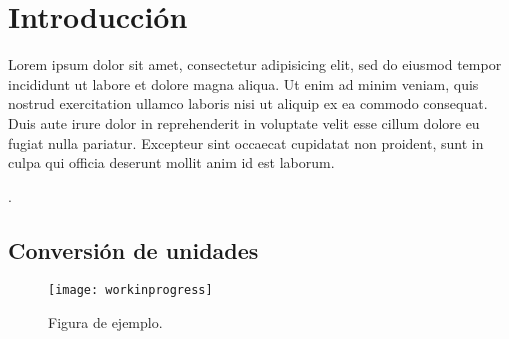 \chapter{Introducción}
Lorem ipsum dolor sit amet, consectetur adipisicing elit, sed do eiusmod tempor incididunt ut labore et dolore magna aliqua. Ut enim ad minim veniam, quis nostrud exercitation ullamco laboris nisi ut aliquip ex ea commodo consequat. Duis aute irure dolor in reprehenderit in voluptate velit esse cillum dolore eu fugiat nulla pariatur. Excepteur sint occaecat cupidatat non proident, sunt in culpa qui officia deserunt mollit anim id est laborum\citep{ejemplo01}.



\lipsum[2]\cite{ejemplo02}.

\lipsum[3-6]\citep{Dan,Baz}

\section{Conversión de unidades}%
\lipsum[7]

\begin{figure}[!h]
  \center
  \texttt{[image: workinprogress]}
  \caption{Figura de ejemplo.}
  \label{fig:ejemplo}
\end{figure}

\lipsum[8-9]
